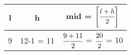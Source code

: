 \documentclass[12pt]{article}
\begin{document}
\begin{center}
  \bgroup
  \def\arraystretch{1.5}%
  \begin{tabular}{ C C C  }
    l
    &
    h
    &
    mid = $\left[ \cfrac{l+h}{2} \right]$ \vspace{5pt}
     \\ 
     &
     12-1 = 11
     &
     $\cfrac{9+11}{2}$ = $\cfrac{20}{2}$ = 10
     \\
  \end{tabular}
  \egroup
\end{center}






\vspace{30pt}
\end{document}
